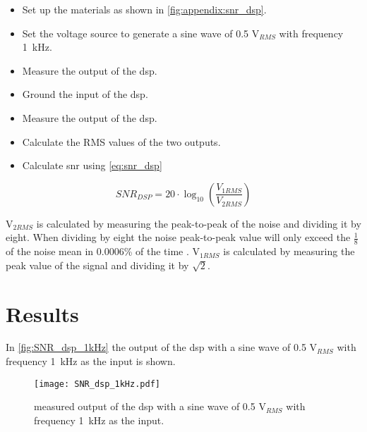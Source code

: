 \begin{itemize}
	\item Set up the materials as shown in \autoref{fig:appendix:snr_dsp}.
	\item Set the voltage source to generate a sine wave of 0.5 V$_{RMS}$ with frequency \SI{1}{\kilo\hertz}.
	\item Measure the output of the \gls{dsp}.
	\item Ground the input of the \gls{dsp}.
	\item Measure the output of the \gls{dsp}.
	\item Calculate the RMS values of the two outputs.
	\item Calculate \gls{snr} using \autoref{eq:snr_dsp}
\end{itemize}

\begin{equation}\label{eq:snr_dsp}
        SNR_{DSP} = 20 \cdot \log_{10}\left(\frac{V_{1RMS}}{V_{2RMS}}\right)
    \end{equation}
    
    \startexplain
    \stopexplain
    
V$_{2RMS}$ is calculated by measuring the peak-to-peak of the noise and dividing it by eight. When dividing by eight the noise peak-to-peak value will only exceed the $\frac{1}{8}$ of the noise mean in 0.0006\% of the time \citep{rms_noise}.
V$_{1RMS}$ is calculated by measuring the peak value of the signal and dividing it by $\sqrt{2}$. 

\section{Results}
In \autoref{fig:SNR_dsp_1kHz} the output of the \gls{dsp} with a sine wave of 0.5 V$_{RMS}$ with frequency \SI{1}{\kilo\hertz} as the input is shown. 

\begin{figure}[!h]
  \centering
  \texttt{[image: SNR\_dsp\_1kHz.pdf]}
  \caption{measured output of the \gls{dsp} with a sine wave of 0.5 V$_{RMS}$ with frequency \SI{1}{\kilo\hertz} as the input.}
  \label{fig:SNR_dsp_1kHz}
\end{figure}


